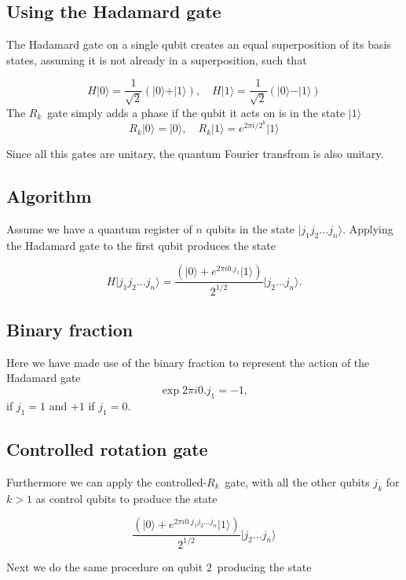 \documentclass[%
oneside,                 %
final,                   %
10pt]{article}
\begin{document}
\subsection{Using the Hadamard gate}
The Hadamard
gate on a single qubit creates an equal superposition of its basis
states, assuming it is not already in a superposition, such that

\[
H\vert 0 \rangle = \frac{1}{\sqrt{2}} \left(\vert 0 \rangle + \vert 1\rangle\right), \quad H\vert 1\rangle = \frac{1}{\sqrt{2}} \left(\vert 0 \rangle - \vert 1\rangle\right)
\]
The $R_k$ gate simply adds a phase if the qubit it acts on is in the state $\vert 1\rangle$
\[
    R_k\vert 0 \rangle = \vert 0 \rangle, \quad R_k\vert 1\rangle = e^{2\pi i/2^{k}}\vert 1\rangle
\]

Since all this gates are unitary, the quantum Fourier transfrom is also unitary.

\subsection{Algorithm}

Assume we have a quantum register of $n$ qubits in the state $\vert j_1 j_2 \dots j_n\rangle$.
Applying the Hadamard gate to the first qubit
produces the state

\[
H\vert j_1 j_2 \dots j_n\rangle = \frac{\left(\vert 0 \rangle + e^{2\pi i 0.j_1}\vert 1\rangle\right)}{2^{1/2}} \vert j_2 \dots j_n\rangle.
\]

\subsection{Binary fraction}

Here we have made use of the binary fraction to represent the action of the Hadamard gate 
\[
\exp{2\pi i 0.j_1} = -1,
\]
if $j_1 = 1$ and $+1$ if $j_1 = 0$.

\subsection{Controlled rotation gate}

Furthermore we can apply the controlled-$R_k$ gate, with all the other qubits $j_k$ for $k>1$ as control qubits to produce the state

\[
\frac{\left(\vert 0 \rangle + e^{2\pi i 0.j_1j_2\dots j_n}\vert 1\rangle\right)}{2^{1/2}} \vert j_2 \dots j_n\rangle
\]

Next we do the same procedure on qubit $2$ producing the state
\end{document}
